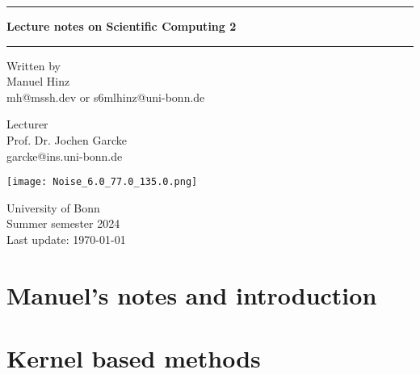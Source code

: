 \documentclass[a4paper, 10pt, oneside]{book}
\author{Manuel Hinz}
\begin{document}
\pagecolor{mycolor}
\begin{titlepage}
    \centering

    \vspace*{1cm}

    \rule{\textwidth}{1pt}

    \vspace{.7\baselineskip}
    {\huge \textbf{Lecture notes on Scientific Computing 2}}

    \rule{\textwidth}{1pt}

    \vspace{1.5cm}

    \large

    \begin{minipage}{.5\textwidth}
        \centering
        Written by \\
        Manuel Hinz\\
        {\normalsize mh@mssh.dev or s6mlhinz@uni-bonn.de}
    \end{minipage}%
    \begin{minipage}{.5\textwidth}
        \centering
        Lecturer\\
        Prof. Dr. Jochen Garcke  \\
        {\normalsize garcke@ins.uni-bonn.de}
    \end{minipage}


    \vspace{3cm}

    \texttt{[image: Noise\_6.0\_77.0\_135.0.png]}

    \vfill

    University of Bonn \\
    Summer semester 2024\\
    Last update: \today
   
\end{titlepage}
\pagecolor{white}
\tableofcontents
\restoregeometry
\setcounter{chapter}{-1}
\chapter{Manuel's notes and introduction}



\chapter{Kernel based methods}

\end{document}
